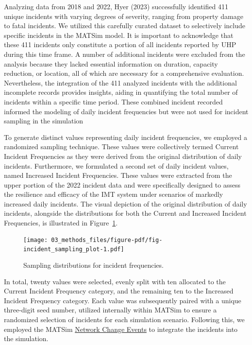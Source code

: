 \documentclass[fancy, oneside, mastersfancy, ms]{byuthesis}
\begin{document}
Analyzing data from 2018 and 2022, Hyer (2023) successfully identified
411 unique incidents with varying degrees of severity, ranging from
property damage to fatal incidents. We utilized this carefully curated
dataset to selectively include specific incidents in the MATSim model.
It is important to acknowledge that these 411 incidents only constitute
a portion of all incidents reported by UHP during this time frame. A
number of additional incidents were excluded from the analysis because
they lacked essential information on duration, capacity reduction, or
location, all of which are necessary for a comprehensive evaluation.
Nevertheless, the integration of the 411 analyzed incidents with the
additional incomplete records provides insights, aiding in quantifying
the total number of incidents within a specific time period. These
combined incident recorded informed the modeling of daily incident
frequencies but were not used for incident sampling in the simulation

To generate distinct values representing daily incident frequencies, we
employed a randomized sampling technique. These values were collectively
termed Current Incident Frequencies as they were derived from the
original distribution of daily incidents. Furthermore, we formulated a
second set of daily incident values, named Increased Incident
Frequencies. These values were extracted from the upper portion of the
2022 incident data and were specifically designed to assess the
resilience and efficacy of the IMT system under scenarios of markedly
increased daily incidents. The visual depiction of the original
distribution of daily incidents, alongside the distributions for both
the Current and Increased Incident Frequencies, is illustrated in
Figure~\ref{fig-incident_sampling_plot}.

\begin{figure}

{\centering \texttt{[image: 03\_methods\_files/figure-pdf/fig-incident\_sampling\_plot-1.pdf]}

}

\caption{\label{fig-incident_sampling_plot}Sampling distributions for
incident frequencies.}

\end{figure}

In total, twenty values were selected, evenly split with ten allocated
to the Current Incident Frequency category, and the remaining ten to the
Increased Incident Frequency category. Each value was subsequently
paired with a unique three-digit seed number, utilized internally within
MATSim to ensure a randomized selection of incidents for each simulation
scenario. Following this, we employed the MATSim
\protect\hyperlink{sec-NCE}{Network Change Events} to integrate the
incidents into the simulation.
\end{document}
